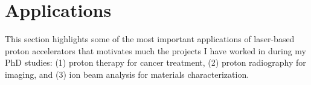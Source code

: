 %
%
%

\section{Applications}

This section highlights some of the most important applications of laser-based proton accelerators that motivates much the projects I have worked in during my PhD studies: (1) proton therapy for cancer treatment, (2) proton radiography for imaging, and (3) ion beam analysis for materials characterization.


